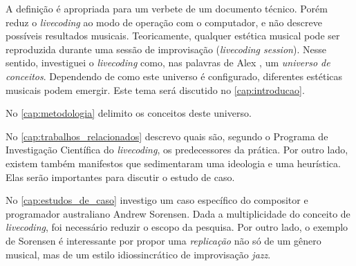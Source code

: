 A definição é apropriada para um verbete de um documento técnico. Porém reduz o \emph{livecoding} ao modo de operação com o computador, e não descreve possíveis resultados musicais. Teoricamente, qualquer estética musical pode ser reproduzida durante uma sessão de improvisação (\emph{livecoding session}). Nesse sentido, investiguei o \emph{livecoding} como, nas palavras de Alex , um \emph{universo de conceitos}. Dependendo de como este universo é configurado, diferentes estéticas musicais podem emergir. Este tema será discutido no \autoref{cap:introducao}. 


No \autoref{cap:metodologia} delimito os conceitos deste universo. 

No \autoref{cap:trabalhos_relacionados} descrevo quais são, segundo o Programa de Investigação Científica do \emph{livecoding}, os predecessores da prática. Por outro lado, existem também manifestos que sedimentaram uma ideologia e uma heurística. Elas serão importantes para discutir o estudo de caso.

No \autoref{cap:estudos_de_caso} investigo um caso específico do compositor e programador australiano Andrew Sorensen. Dada a multiplicidade do conceito de \emph{livecoding}, foi necessário reduzir o escopo da pesquisa. Por outro lado, o exemplo de Sorensen é interessante por propor uma \emph{replicação} não só de um gênero musical, mas de um estilo idiossincrático de improvisação \emph{jazz}.